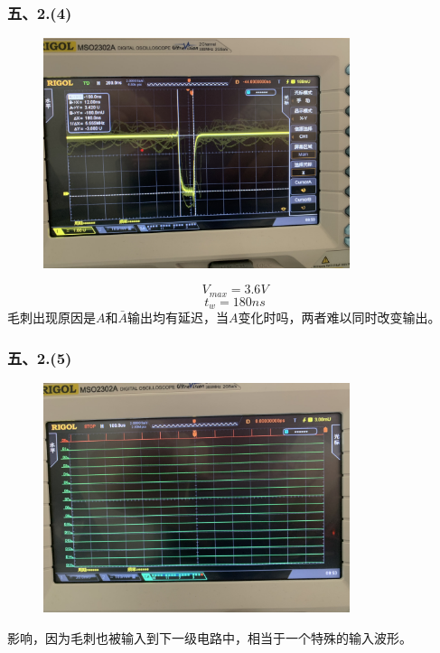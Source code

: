 \documentclass[UTF8, a4paper, 11pt]{article}
\begin{document}
\subsubsection{五、2.(4)}
\begin{figure}[H]
    \centering
    \includegraphics[width=0.8\textwidth]{模拟.JPG}
\end{figure}
$$V_{max}=3.6V$$
$$t_w=180ns$$
毛刺出现原因是$A$和$\bar A$输出均有延迟，当$A$变化时吗，两者难以同时改变输出。
\subsubsection{五、2.(5)}
\begin{figure}[H]
    \centering
    \includegraphics[width=0.8\textwidth]{反相.JPG}
\end{figure}
影响，因为毛刺也被输入到下一级电路中，相当于一个特殊的输入波形。
\end{document}
